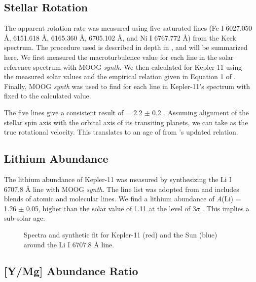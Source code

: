 \documentclass[oneside]{emulateapj}
\begin{document}
\subsection{Stellar Rotation}

The apparent rotation rate \vsini was measured using five saturated lines (Fe I 6027.050 \r{A}, 6151.618 \r{A}, 6165.360 \r{A}, 6705.102 \r{A}, and Ni I 6767.772 \r{A}) from the Keck spectrum. The procedure used is described in depth in \citet{dosSantos2016}, and will be summarized here. We first measured the macroturbulence value \vmacro for each line in the solar reference spectrum with MOOG \textit{synth}. We then calculated \vmacro for Kepler-11 using the measured solar values and the empirical relation given in Equation 1 of \citet{dosSantos2016}. Finally, MOOG \textit{synth} was used to find \vsini for each line in Kepler-11's spectrum with \vmacro fixed to the calculated value.

The five lines give a consistent result of \vsini = 2.2 $\pm$ 0.2 \kms. Assuming alignment of the stellar spin axis with the orbital axis of its transiting planets, we can take \vsini as the true rotational velocity. This translates to an age of  from \citet{dosSantos2016}'s updated relation.

\subsection{Lithium Abundance}
\label{s:lithium}

The lithium abundance of Kepler-11 was measured by synthesizing the Li I 6707.8 \r{A} line with MOOG \textit{synth}. The line list was adopted from \citet{Melendez2012} and includes blends of atomic and molecular lines. We find a lithium abundance of \textit{A}(Li) = 1.26 $\pm$ 0.05, higher than the solar value of 1.11 at the level of 3$\sigma$ . This implies a sub-solar age.

\begin{figure}
\centering
\caption{Spectra and synthetic fit for Kepler-11 (red) and the Sun (blue) around the Li I 6707.8 \r{A} line.}
\label{fig:lithium}
\end{figure}


\subsection{[Y/Mg] Abundance Ratio}
\end{document}
